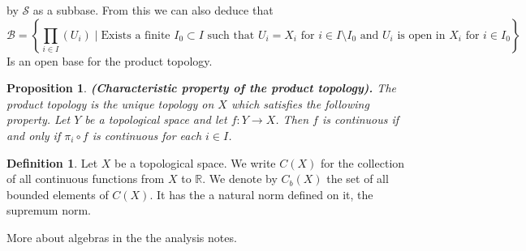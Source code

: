 \documentclass[11pt,a4paper]{article}
\theoremstyle{definition}
\newtheorem{definition}{Definition}[section]
\theoremstyle{plain}
\newtheorem{proposition}[theorem]{Proposition}
\newcommand{\R}{\mathbb{R}}
\newcommand{\set}[2]{ \left\{ #1 \mid #2 \right\} }
\renewcommand{\tt}[1]{\textnormal{\textbf{(#1).}}} %
\begin{document}
	by $\mathcal{S}$ as a subbase. From this we can also deduce that
	\[
		\mathcal{B} = \set{\prod_{i \in I}(U_i)}{\text{Exists a finite
		$I_0 \subset I$ such that $U_i = X_i$ for $i \in I \setminus I_0$ and
		$U_i$ is open in $X_i$ for $i \in I_0$}}
	\]
	Is an open base for the product topology.
	\begin{proposition}
		\tt{Characteristic property of the product topology}
		The product topology is the unique topology on $X$ which satisfies the 
		following property. Let $Y$ be a topological space and let 
		$f \colon Y \to X$. Then $f$ is continuous if and only if 
		$\pi_i \circ f$ is continuous for each $i \in I$.
	\end{proposition}
	\begin{definition}
		Let $X$ be a topological space. We write $C(X)$ for the collection of 
		all continuous functions from $X$ to $\R$. We denote by $C_b(X)$ the set 
		of all bounded elements of $C(X)$. It has the a natural norm defined on
		it, the supremum norm.
	\end{definition}
	More about algebras in the the analysis notes.
	
	\newpage
	
\end{document}
